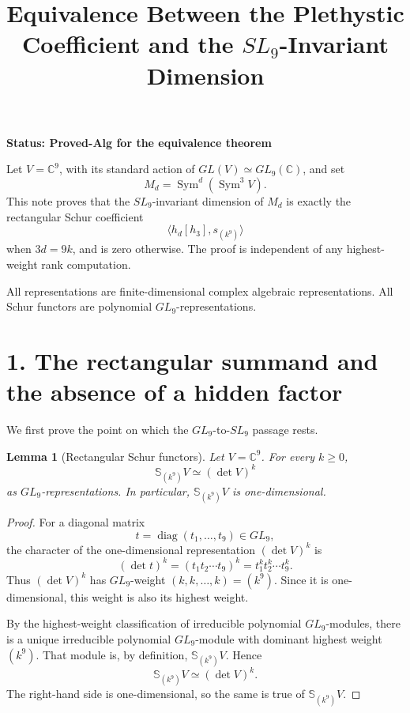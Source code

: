 \documentclass[11pt]{article}
\newtheorem{lemma}{Lemma}
\newcommand{\C}{\mathbb C}
\newcommand{\Sym}{\operatorname{Sym}}
\newcommand{\Schur}{\mathbb S}
\begin{document}
\title{Equivalence Between the Plethystic Coefficient and the \(SL_9\)-Invariant Dimension}
\author{}
\date{}
\maketitle

\begin{center}
\textbf{Status: Proved-Alg for the equivalence theorem}
\end{center}

Let \(V=\C^9\), with its standard action of \(GL(V)\simeq GL_9(\C)\), and set
\[
    M_d=\Sym^d(\Sym^3 V).
\]
This note proves that the \(SL_9\)-invariant dimension of \(M_d\) is exactly the
rectangular Schur coefficient
\[
    \big\langle h_d[h_3],s_{(k^9)}\big\rangle
\]
when \(3d=9k\), and is zero otherwise. The proof is independent of any
highest-weight rank computation.

All representations are finite-dimensional complex algebraic representations.
All Schur functors are polynomial \(GL_9\)-representations.

\section*{1. The rectangular summand and the absence of a hidden factor}

We first prove the point on which the \(GL_9\)-to-\(SL_9\) passage rests.

\begin{lemma}[Rectangular Schur functors]
Let \(V=\C^9\). For every \(k\geq 0\),
\[
    \Schur_{(k^9)}V \simeq (\det V)^k
\]
as \(GL_9\)-representations. In particular, \(\Schur_{(k^9)}V\) is
one-dimensional.
\end{lemma}

\begin{proof}
For a diagonal matrix
\[
    t=\operatorname{diag}(t_1,\ldots,t_9)\in GL_9,
\]
the character of the one-dimensional representation \((\det V)^k\) is
\[
    (\det t)^k=(t_1t_2\cdots t_9)^k=t_1^k t_2^k\cdots t_9^k.
\]
Thus \((\det V)^k\) has \(GL_9\)-weight \((k,k,\ldots,k)=(k^9)\).
Since it is one-dimensional, this weight is also its highest weight.

By the highest-weight classification of irreducible polynomial \(GL_9\)-modules,
there is a unique irreducible polynomial \(GL_9\)-module with dominant highest
weight \((k^9)\). That module is, by definition, \(\Schur_{(k^9)}V\). Hence
\[
    \Schur_{(k^9)}V\simeq(\det V)^k.
\]
The right-hand side is one-dimensional, so the same is true of
\(\Schur_{(k^9)}V\).
\end{proof}
\end{document}
